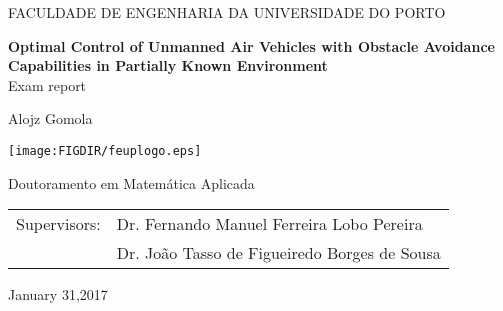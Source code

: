 \pagestyle{empty}
\begin{center}

{FACULDADE DE ENGENHARIA DA UNIVERSIDADE DO PORTO}

\vspace{3cm}
{\LARGE\bfseries Optimal Control of Unmanned Air Vehicles with Obstacle Avoidance Capabilities in
Partially Known Environment}\\
\vspace{1cm}
{\LARGE Exam report}

\vspace{1cm}
{\LARGE Alojz Gomola}


\vspace{5cm}
\centerline{\mbox{\texttt{[image: \\FIGDIR/feuplogo.eps]}}}


\vspace{2cm}
{\LARGE Doutoramento em Matemática Aplicada}

\vspace{1.5cm}
\begin{tabular}{rl}  
\noalign{\vspace{2mm}}
Supervisors: & Dr. Fernando Manuel Ferreira Lobo Pereira\\
\noalign{\vspace{2mm}}
& Dr. João Tasso de Figueiredo Borges de Sousa\\ 
\end{tabular}

\vspace{2cm}
{January 31,2017}
\end{center}

\newpage
\openright

\pagestyle{plain}
\setcounter{page}{1}

\tableofcontents


\newpage
\listoffigures

\newpage
\listoftables
